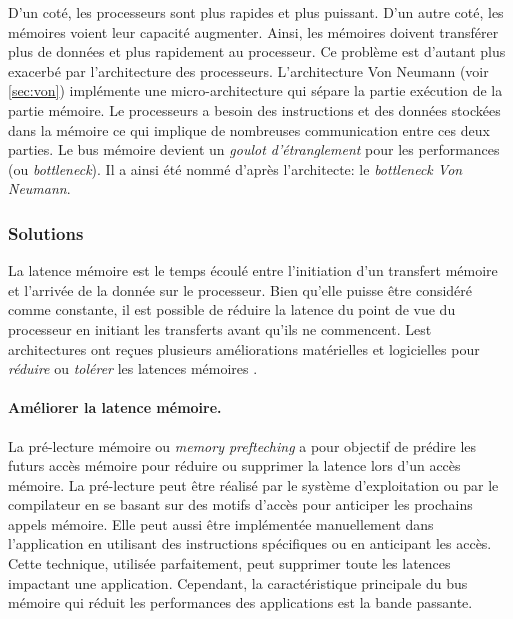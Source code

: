 D'un coté, les processeurs sont plus rapides et plus puissant. D'un autre coté, les mémoires voient leur capacité augmenter. Ainsi, les mémoires doivent transférer plus de données et plus rapidement au processeur. Ce problème est d'autant plus exacerbé par l'architecture des processeurs. L’architecture Von Neumann (voir \autoref{sec:von}) implémente une micro-architecture qui sépare la partie exécution de la partie mémoire.
Le processeurs a besoin des instructions et des données stockées dans la mémoire ce qui implique de nombreuses communication entre ces deux parties. Le bus mémoire devient un \textit{goulot d'étranglement} pour les performances (ou \textit{bottleneck}). Il a ainsi été nommé d'après l'architecte: le \textit{bottleneck Von Neumann}.




\subsubsection{Solutions}

La latence mémoire est le temps écoulé entre l’initiation d’un transfert mémoire et l'arrivée de la donnée sur le processeur. Bien qu'elle puisse être considéré comme constante, il est possible de réduire la latence du point de vue du processeur en initiant les transferts avant qu'ils ne commencent.  Lest architectures ont reçues plusieurs améliorations matérielles et logicielles pour \textit{réduire} ou \textit{tolérer} les latences mémoires \cite{Efnusheva2017ASO}.



\paragraph{Améliorer la latence mémoire.} 
La pré-lecture mémoire \cite{baer1991effective, mowry1991tolerating} ou \textit{memory prefteching}  a pour objectif de prédire les futurs accès mémoire pour réduire ou supprimer la latence lors d'un accès mémoire. La pré-lecture peut être réalisé par le système d'exploitation ou par le compilateur en se basant sur des motifs d'accès pour anticiper les prochains appels mémoire. Elle peut aussi être implémentée manuellement dans l'application en utilisant des instructions spécifiques ou en anticipant les accès. Cette technique, utilisée parfaitement, peut supprimer toute les latences impactant une application. Cependant, la caractéristique principale du bus mémoire qui réduit les performances des applications est la bande passante.

